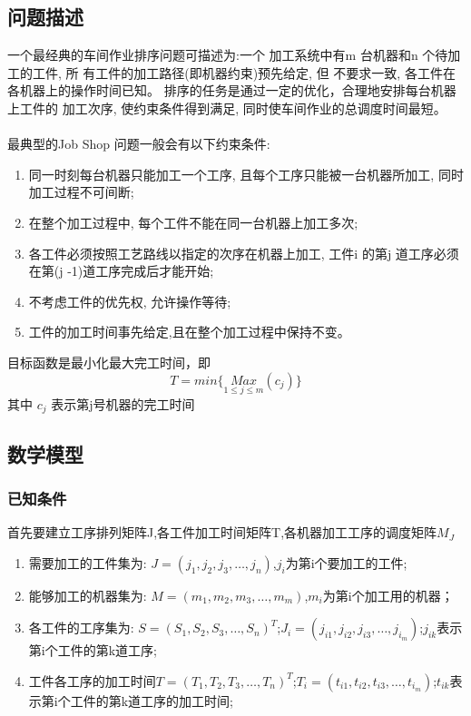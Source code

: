 \documentclass[UTF8]{ctexart}
\begin{document}
\begin{multicols}{2}
\subsection{问题描述}
一个最经典的车间作业排序问题可描述为:一个
加工系统中有m 台机器和n 个待加工的工件, 所
有工件的加工路径(即机器约束)预先给定, 但
不要求一致, 各工件在各机器上的操作时间已知。
排序的任务是通过一定的优化，合理地安排每台机器上工件的
加工次序, 使约束条件得到满足, 同时使车间作业的总调度时间最短。\\\\
最典型的Job Shop 问题一般会有以下约束条件:
\begin{enumerate}
	\item 同一时刻每台机器只能加工一个工序, 且每个工序只能被一台机器所加工, 同时加工过程不可间断;
	\item 在整个加工过程中, 每个工件不能在同一台机器上加工多次;
	\item 各工件必须按照工艺路线以指定的次序在机器上加工, 工件i 的第j 道工序必须在第(j -1)道工序完成后才能开始;
	\item 不考虑工件的优先权, 允许操作等待;
	\item 工件的加工时间事先给定,且在整个加工过程中保持不变。
\end{enumerate} 
	目标函数是最小化最大完工时间，即
	$$ T = min\{ \underset{{1 \leq j \leq m}}{Max}(c_j)\}$$
	其中 $c_j$ 表示第j号机器的完工时间


\subsection{数学模型}
\subsubsection{已知条件}
首先要建立工序排列矩阵J,各工件加工时间矩阵T,各机器加工工序的调度矩阵$M_J$
\begin{enumerate}
	\item 需要加工的工件集为: $J=(j_1,j_2,j_3,\ldots,j_n)$,$j_i$为第i个要加工的工件;
	\item 能够加工的机器集为: $M=(m_1,m_2,m_3,\ldots,m_m)$,$m_i$为第i个加工用的机器；
	\item 各工件的工序集为: $S=(S_1,S_2,S_3,\ldots,S_n)^T$;$J_i=(j_{i1},j_{i2},j_{i3},\ldots,j_{i_m})$;$j_{ik}$表示第i个工件的第k道工序;
	\item 工件各工序的加工时间$T=(T_1,T_2,T_3,\ldots,T_n)^T$;$T_i=(t_{i1},t_{i2},t_{i3},\ldots,t_{i_m})$;$t_{ik}$表示第i个工件的第k道工序的加工时间;
\end{enumerate}

\end{multicols}
\end{document}
